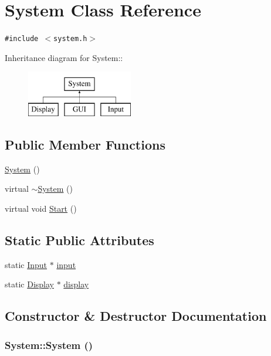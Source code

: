 \hypertarget{class_system}{
\section{System Class Reference}
\label{class_system}
}
{\tt \#include $<$system.h$>$}

Inheritance diagram for System::\begin{figure}[H]
\begin{center}
\leavevmode
\includegraphics[height=2cm]{class_system}
\end{center}
\end{figure}
\subsection*{Public Member Functions}
\begin{CompactItemize}
\item 
\hyperlink{class_system_e317936c9bcf1374d61745572e0f2f8a}{System} ()
\item 
virtual \hyperlink{class_system_3be70bb338e3f062f821173fd15680d0}{$\sim$System} ()
\item 
virtual void \hyperlink{class_system_99d3c3036a58c1698f286677c4ace286}{Start} ()
\end{CompactItemize}
\subsection*{Static Public Attributes}
\begin{CompactItemize}
\item 
static \hyperlink{class_input}{Input} $\ast$ \hyperlink{class_system_d9b21648cf5dfb2f66eb3af1b9840cab}{input}
\item 
static \hyperlink{class_display}{Display} $\ast$ \hyperlink{class_system_42b64214c5597b152328910e72f15545}{display}
\end{CompactItemize}


\subsection{Constructor \& Destructor Documentation}
\hypertarget{class_system_e317936c9bcf1374d61745572e0f2f8a}{
\subsubsection[{System}]{\setlength{\rightskip}{0pt plus 5cm}System::System ()}}
\label{class_system_e317936c9bcf1374d61745572e0f2f8a}


